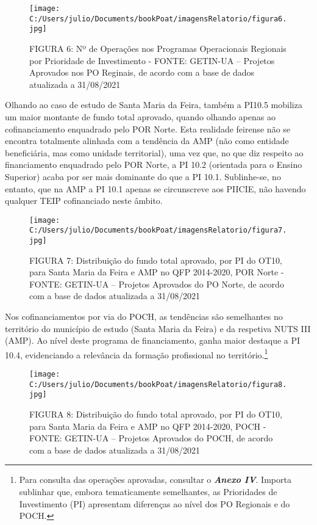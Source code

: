 \documentclass[
]{book}
\begin{document}
\begin{figure}
\centering
\texttt{[image: C:/Users/julio/Documents/bookPoat/imagensRelatorio/figura6.jpg]}
\caption{FIGURA 6: Nº de Operações nos Programas Operacionais Regionais por Prioridade de Investimento - FONTE: GETIN-UA -- Projetos Aprovados nos PO Reginais, de acordo com a base de dados atualizada a 31/08/2021}
\end{figure}

Olhando ao caso de estudo de Santa Maria da Feira, também a PI10.5 mobiliza um maior montante de fundo total aprovado, quando olhando apenas ao cofinanciamento enquadrado pelo POR Norte. Esta realidade feirense não se encontra totalmente alinhada com a tendência da AMP (não como entidade beneficiária, mas como unidade territorial), uma vez que, no que diz respeito ao financiamento enquadrado pelo POR Norte, a PI 10.2 (orientada para o Ensino Superior) acaba por ser mais dominante do que a PI 10.1. Sublinhe-se, no entanto, que na AMP a PI 10.1 apenas se circunscreve aos PIICIE, não havendo qualquer TEIP cofinanciado neste âmbito.

\begin{figure}
\centering
\texttt{[image: C:/Users/julio/Documents/bookPoat/imagensRelatorio/figura7.jpg]}
\caption{FIGURA 7: Distribuição do fundo total aprovado, por PI do OT10, para Santa Maria da Feira e AMP no QFP 2014-2020, POR Norte - FONTE: GETIN-UA -- Projetos Aprovados do PO Norte, de acordo com a base de dados atualizada a 31/08/2021}
\end{figure}

Nos cofinanciamentos por via do POCH, as tendências são semelhantes no território do município de estudo (Santa Maria da Feira) e da respetiva NUTS III (AMP). Ao nível deste programa de financiamento, ganha maior destaque a PI 10.4, evidenciando a relevância da formação profissional no território.\footnote{Para consulta das operações aprovadas, consultar o \textbf{\emph{Anexo IV}}.
  Importa sublinhar que, embora tematicamente semelhantes, as Prioridades de Investimento (PI) apresentam diferenças ao nível dos PO Regionais e do POCH.}

\begin{figure}
\centering
\texttt{[image: C:/Users/julio/Documents/bookPoat/imagensRelatorio/figura8.jpg]}
\caption{FIGURA 8: Distribuição do fundo total aprovado, por PI do OT10, para Santa Maria da Feira e AMP no QFP 2014-2020, POCH - FONTE: GETIN-UA -- Projetos Aprovados do POCH, de acordo com a base de dados atualizada a 31/08/2021}
\end{figure}
\end{document}
